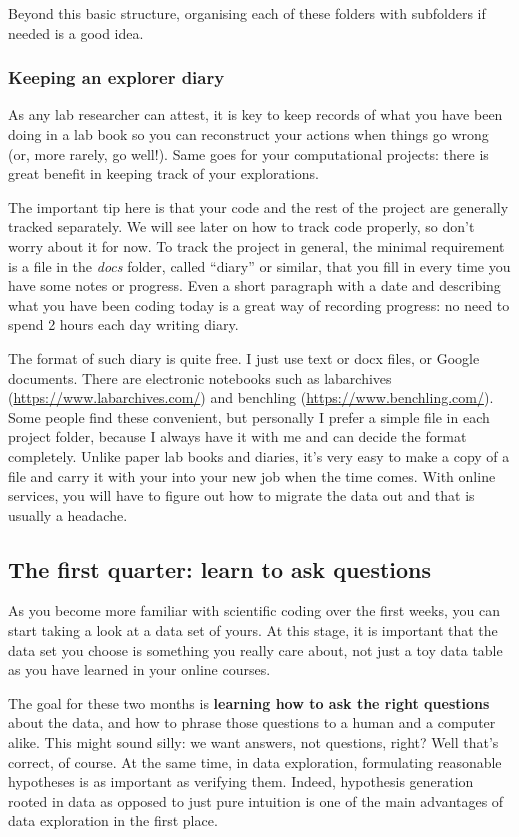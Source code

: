 \documentclass[12pt,a4paper,notitlepage,onecolumn]{article}
\begin{document}
Beyond this basic structure, organising each of these folders with subfolders if needed is a good idea.

\subsubsection{Keeping an explorer diary}
As any lab researcher can attest, it is key to keep records of what you have been doing in a lab book so you can reconstruct your actions when things go wrong (or, more rarely, go well!). Same goes for your computational projects: there is great benefit in keeping track of your explorations.

The important tip here is that your code and the rest of the project are generally tracked separately. We will see later on how to track code properly, so don't worry about it for now. To track the project in general, the minimal requirement is a file in the \textit{docs} folder, called ``diary'' or similar, that you fill in every time you have some notes or progress. Even a short paragraph with a date and describing what you have been coding today is a great way of recording progress: no need to spend 2 hours each day writing diary.

The format of such diary is quite free. I just use text or docx files, or Google documents. There are electronic notebooks such as labarchives (\url{https://www.labarchives.com/}) and benchling (\url{https://www.benchling.com/}). Some people find these convenient, but personally I prefer a simple file in each project folder, because I always have it with me and can decide the format completely. Unlike paper lab books and diaries, it's very easy to make a copy of a file and carry it with your into your new job when the time comes. With online services, you will have to figure out how to migrate the data out and that is usually a headache.


\subsection{The first quarter: learn to ask questions}
As you become more familiar with scientific coding over the first weeks, you can start taking a look at a data set of yours. At this stage, it is important that the data set you choose is something you really care about, not just a toy data table as you have learned in your online courses.

The goal for these two months is \textbf{learning how to ask the right questions} about the data, and how to phrase those questions to a human and a computer alike. This might sound silly: we want answers, not questions, right? Well that's correct, of course. At the same time, in data exploration, formulating reasonable hypotheses is as important as verifying them. Indeed, hypothesis generation rooted in data as opposed to just pure intuition is one of the main advantages of data exploration in the first place.
\end{document}

